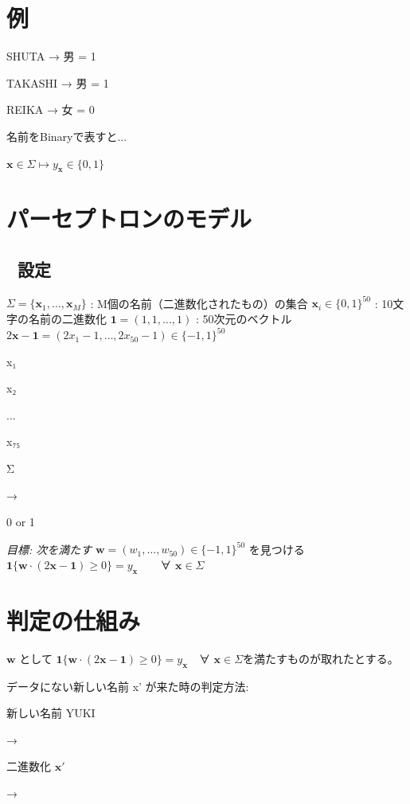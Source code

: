 \documentclass[uplatex,dvipdfmx,11pt,a4paper,openany]{bxjsbook}
\begin{document}
\section{例}
SHUTA
→
男 = 1

TAKASHI
→
男 = 1

REIKA
→
女 = 0

名前をBinaryで表すと...

\( \mathbf{x} \in \Sigma \mapsto y_{\mathbf{x}} \in \{0, 1\} \)

\section{パーセプトロンのモデル}
\subsection{📐 設定}
\( \Sigma = \{\mathbf{x}_1, \ldots, \mathbf{x}_M\} \) : M個の名前（二進数化されたもの）の集合\allowbreak{} 
                \( \mathbf{x}_i \in \{0, 1\}^{50} \) : 10文字の名前の二進数化\allowbreak{} 
                \( \mathbf{1} = (1, 1, \ldots, 1) \) : 50次元のベクトル\allowbreak{} 
                \( 2\mathbf{x} - \mathbf{1} = (2x_1 - 1, \ldots, 2x_{50} - 1) \in \{-1, 1\}^{50} \)

x₁

x₂

...

x₇₅

Σ

→

0 or 1

\emph{目標: 次を満たす} \( \mathbf{w} = (w_1, \ldots, w_{50}) \in \{-1, 1\}^{50} \) を見つける\allowbreak{} 
\( \mathbf{1}\{ \mathbf{w} \cdot (2\mathbf{x} - \mathbf{1}) \ge 0 \} = y_{\mathbf{x}} \)　　∀ \( \mathbf{x} \in \Sigma \)

\section{判定の仕組み}
\( \mathbf{w} \) として \( \mathbf{1}\{ \mathbf{w} \cdot (2\mathbf{x} - \mathbf{1}) \ge 0 \} = y_{\mathbf{x}} \)　∀ \( \mathbf{x} \in \Sigma \)を満たすものが取れたとする。

データにない新しい名前 x' が来た時の判定方法:

新しい名前\allowbreak{} YUKI

→

二進数化\allowbreak{} \( \mathbf{x}' \)

→
\end{document}
